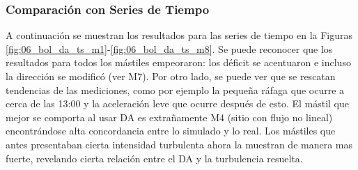 \subsubsection{Comparación con Series de Tiempo}
A continuación se muestran los resultados para las series de tiempo en la Figuras \ref{fig:06_bol_da_ts_m1}-\ref{fig:06_bol_da_ts_m8}. Se puede reconocer que los resultados para todos los mástiles empeoraron: los déficit se acentuaron e incluso la dirección se modificó (ver M7). Por otro lado, se puede ver que se rescatan tendencias de las mediciones, como por ejemplo la pequeña ráfaga que ocurre a cerca de las 13:00 y la aceleración leve que ocurre después de esto. El mástil que mejor se comporta al usar DA es extrañamente M4 (sitio con flujo no lineal) encontrándose alta concordancia entre lo simulado y lo real. Los mástiles que antes presentaban cierta intensidad turbulenta ahora la muestran de manera mas fuerte, revelando cierta relación entre el DA y la turbulencia resuelta.

